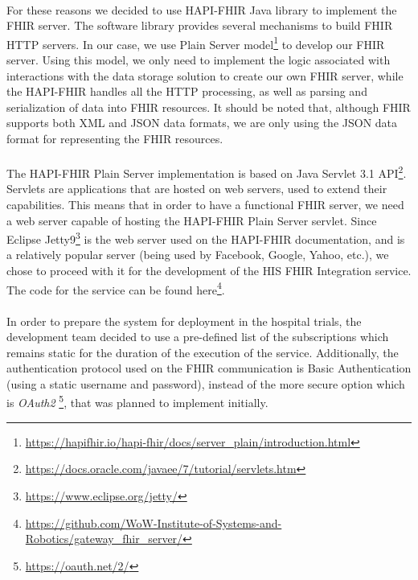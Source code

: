 \paragraph{} For these reasons we decided to use HAPI-FHIR Java library to implement the \acs{FHIR} server. The software library provides several mechanisms to build \acs{FHIR} \acs{HTTP} servers. In our case, we use Plain Server model\footnote{\url{https://hapifhir.io/hapi-fhir/docs/server_plain/introduction.html}} to develop our \acs{FHIR} server. Using this model, we only need to implement the logic associated with interactions with the data storage solution to create our own \acs{FHIR} server, while the HAPI-FHIR handles all the \acs{HTTP} processing, as well as parsing and serialization of data into \acs{FHIR} resources. It should be noted that, although \acs{FHIR} supports both \acf{XML} and \acf{JSON} data formats, we  are only using the \acs{JSON} data format for representing the \acs{FHIR} resources. 

\paragraph{} The HAPI-FHIR Plain Server implementation is based on Java Servlet  	
3.1 \acs{API}\footnote{\url{https://docs.oracle.com/javaee/7/tutorial/servlets.htm}}. Servlets are applications that are hosted on web servers, used to extend their capabilities. This means that in order to have a functional \acs{FHIR} server, we need a web server capable of hosting the HAPI-FHIR Plain Server servlet. Since Eclipse Jetty9\footnote{\url{https://www.eclipse.org/jetty/}} is the web server used on the HAPI-FHIR documentation, and is a relatively popular server (being used by Facebook, Google, Yahoo, etc.), we chose to proceed with it for the development of the \acs{HIS} \acs{FHIR} Integration service. The code for the service can be found here\footnote{\url{https://github.com/WoW-Institute-of-Systems-and-Robotics/gateway_fhir_server/}}.

\paragraph{} In order to prepare the system for deployment in the hospital trials, the development team decided to use a pre-defined list of the subscriptions which remains static for the duration of the execution of the service. Additionally, the authentication protocol used on the \acs{FHIR} communication is Basic Authentication (using a static username and password), instead of the more secure option which is \textit{OAuth2} \footnote{\url{https://oauth.net/2/}}, that was planned to implement initially.


